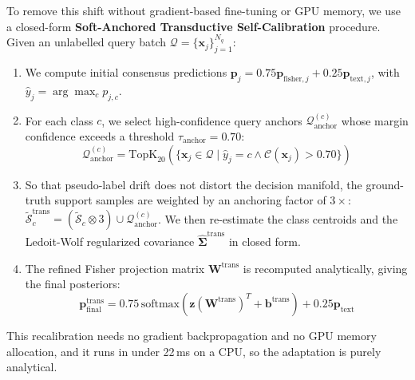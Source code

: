 \documentclass[conference]{IEEEtran}
\begin{document}
To remove this shift without gradient-based fine-tuning or GPU memory, we use a closed-form \textbf{Soft-Anchored Transductive Self-Calibration} procedure. Given an unlabelled query batch $\mathcal{Q} = \{\mathbf{x}_j\}_{j=1}^{N_q}$:
\begin{enumerate}
    \item We compute initial consensus predictions $\mathbf{p}_j = 0.75 \mathbf{p}_{\text{fisher}, j} + 0.25 \mathbf{p}_{\text{text}, j}$, with $\hat{y}_j = \arg\max_c p_{j, c}$.
    \item For each class $c$, we select high-confidence query anchors $\mathcal{Q}_{\text{anchor}}^{(c)}$ whose margin confidence exceeds a threshold $\tau_{\text{anchor}} = 0.70$:
    \begin{equation}
    \mathcal{Q}_{\text{anchor}}^{(c)} = \text{TopK}_{20}\left(\{\mathbf{x}_j \in \mathcal{Q} \mid \hat{y}_j = c \land \mathcal{C}(\mathbf{x}_j) > 0.70\}\right)
    \end{equation}
    \item So that pseudo-label drift does not distort the decision manifold, the ground-truth support samples are weighted by an anchoring factor of $3\times$: $\tilde{\mathcal{S}}_c^{\text{trans}} = (\tilde{\mathcal{S}}_c \otimes 3) \cup \mathcal{Q}_{\text{anchor}}^{(c)}$. We then re-estimate the class centroids and the Ledoit-Wolf regularized covariance $\hat{\mathbf{\Sigma}}^{\text{trans}}$ in closed form.
    \item The refined Fisher projection matrix $\mathbf{W}^{\text{trans}}$ is recomputed analytically, giving the final posteriors:
    \begin{equation}
    \mathbf{p}_{\text{final}}^{\text{trans}} = 0.75 \, \text{softmax}\left(\mathbf{z} (\mathbf{W}^{\text{trans}})^T + \mathbf{b}^{\text{trans}}\right) + 0.25 \mathbf{p}_{\text{text}}
    \end{equation}
\end{enumerate}
This recalibration needs no gradient backpropagation and no GPU memory allocation, and it runs in under 22\,ms on a CPU, so the adaptation is purely analytical.
\end{document}
